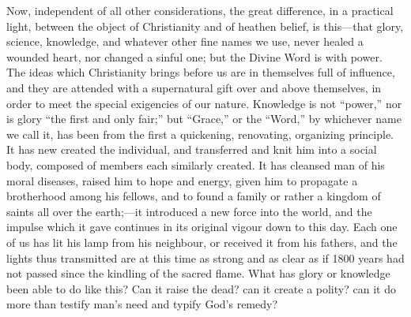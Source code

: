 Now, independent of all other considerations, the great difference,
in a practical light, between the object of Christianity and of
heathen belief, is this—that glory, science, knowledge, and whatever
other fine names we use, never healed a wounded heart, nor changed a
sinful one; but the Divine Word is with power. The ideas which
Christianity brings before us are in themselves full of influence, and
they are attended with a supernatural gift over and above themselves,
in order to meet the special exigencies of our nature. Knowledge is
not ``power,'' nor is glory ``the first and only
fair;'' but ``Grace,'' or the ``Word,'' by
whichever name we call it, has been from the first a quickening,
renovating, organizing principle. It has new created the individual,
and transferred and knit him into a social body, composed of members
each similarly created. It has cleansed man of his moral
diseases, raised him to hope and energy, given him to propagate a
brotherhood among his fellows, and to found a family or rather a
kingdom of saints all over the earth;—it introduced a new force into
the world, and the impulse which it gave continues in its original
vigour down to this day. Each one of us has lit his lamp from his
neighbour, or received it from his fathers, and the lights thus
transmitted are at this time as strong and as clear as if 1800 years
had not passed since the kindling of the sacred flame. What has glory
or knowledge been able to do like this? Can it raise the dead? can it
create a polity? can it do more than testify man's need and typify God's
remedy?

